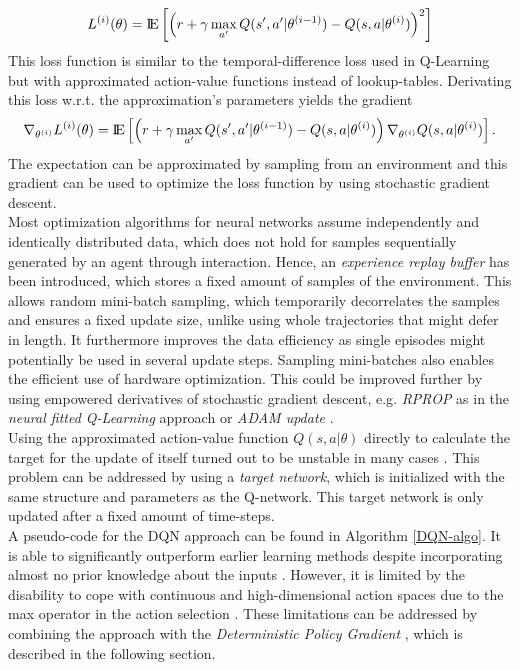 \[
L^{(i)}(\theta)={\rm I\!E} \left[\left(r+\gamma \max_{a'} Q(s',a'|\theta^{(i-1)})-Q(s,a|\theta^{(i)})\right)^2\right] 
\]
This loss function is similar to the temporal-difference loss used in Q-Learning but with approximated action-value functions instead of lookup-tables. Derivating this loss w.r.t. the approximation's parameters yields the gradient
\[
\nabla_{\theta^{(i)}}L^{(i)}(\theta)={\rm I\!E} \left[\left(r+\gamma \max_{a'} Q(s', 
a'|\theta^{(i-1)})-Q(s,a|\theta^{(i)})\right)\nabla_{\theta^{(i)}}Q(s,a|\theta^{(i)})\right]. 
\]
The expectation can be approximated by sampling from an environment and this gradient can be used to optimize the loss function by using stochastic gradient descent.\\
Most optimization algorithms for neural networks assume independently and identically distributed data, which does not hold for samples sequentially generated by an agent through interaction. Hence, an \textit{experience replay buffer} has been introduced, which stores a fixed amount of samples of the environment. This allows random mini-batch sampling, which temporarily decorrelates the samples and ensures a fixed update size, unlike using whole trajectories that might defer in length. It furthermore improves the data efficiency as single episodes might potentially be used in several update steps. Sampling mini-batches also enables the efficient use of hardware optimization. This could be improved further by using empowered derivatives of stochastic gradient descent, e.g. \textit{RPROP} as in the \textit{neural fitted Q-Learning} approach \citep{riedmiller2005neural} or \textit{ADAM update} \citep{kingma2014adam}.\\
Using the approximated action-value function $Q(s,a|\theta)$ directly to calculate the target for the update of itself turned out to be unstable in many cases \citep{mnih2015human}. This problem can be addressed by using a \textit{target network}, which is initialized with the same structure and parameters as the Q-network. This target network is only updated after a fixed amount of time-steps.\\
A pseudo-code for the DQN approach can be found in Algorithm \ref{DQN-algo}. It is able to significantly outperform earlier learning methods despite incorporating almost no prior knowledge about the inputs \citep{mnih2013playing}. However, it is limited by the disability to cope with continuous and high-dimensional action spaces due to the max operator in the action selection \citep{lillicrap2015continuous}. These limitations can be addressed by combining the approach with the \textit{Deterministic Policy Gradient} \citep{silver2014deterministic}, which is described in the following section.

